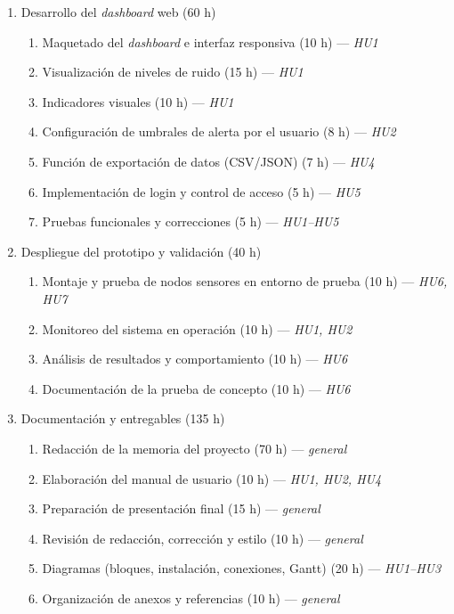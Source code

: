 \documentclass[
11pt, %
]{charter}
\begin{document}
\begin{enumerate}
    \item Desarrollo del \textit{dashboard} web (60 h)
    \begin{enumerate}
        \item Maquetado del \textit{dashboard} e interfaz responsiva (10 h) — \textit{HU1}
        \item Visualización de niveles de ruido (15 h) — \textit{HU1}
        \item Indicadores visuales (10 h) — \textit{HU1}
        \item Configuración de umbrales de alerta por el usuario (8 h) — \textit{HU2}
        \item Función de exportación de datos (CSV/JSON) (7 h) — \textit{HU4}
        \item Implementación de login y control de acceso (5 h) — \textit{HU5}
        \item Pruebas funcionales y correcciones (5 h) — \textit{HU1–HU5}
    \end{enumerate}

    \item Despliegue del prototipo y validación (40 h)
    \begin{enumerate}
        \item Montaje y prueba de nodos sensores en entorno de prueba (10 h) — \textit{HU6, HU7}
        \item Monitoreo del sistema en operación (10 h) — \textit{HU1, HU2}
        \item Análisis de resultados y comportamiento (10 h) — \textit{HU6}
        \item Documentación de la prueba de concepto (10 h) — \textit{HU6}
    \end{enumerate}

    \item Documentación y entregables (135 h)
    \begin{enumerate}
        \item Redacción de la memoria del proyecto (70 h) — \textit{general}
        \item Elaboración del manual de usuario (10 h) — \textit{HU1, HU2, HU4}
        \item Preparación de presentación final (15 h) — \textit{general}
        \item Revisión de redacción, corrección y estilo (10 h) — \textit{general}
        \item Diagramas (bloques, instalación, conexiones, Gantt) (20 h) — \textit{HU1–HU3}
        \item Organización de anexos y referencias (10 h) — \textit{general}
    \end{enumerate}
\end{enumerate}
\end{document}
